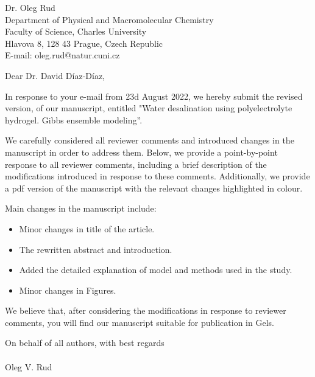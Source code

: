 \documentclass[12pt]{dinbrief}
\date{\today}
\newcommand{\theeditor}{Dr. David Díaz-Díaz}
\begin{document}
\begin{letter}{
Dr. Oleg Rud\\
Department of Physical and Macromolecular Chemistry\\
Faculty of Science, Charles University\\
Hlavova 8, 128 43 Prague, Czech Republic\\
E-mail: oleg.rud@natur.cuni.cz\\
}
\vspace*{-1.5cm}

\opening{Dear \theeditor,}


In response to your e-mail from 23d August 2022, we hereby submit the revised
version, of our manuscript, entitled "Water desalination using polyelectrolyte hydrogel. Gibbs ensemble modeling''.

We carefully considered all reviewer comments and introduced changes in the manuscript in order to address them.
Below, we provide a point-by-point response to all reviewer comments, including a brief description of the modifications introduced in response to these comments.
Additionally, we provide a pdf version of the manuscript with the relevant changes highlighted in colour.

Main changes in the manuscript include:
\begin{itemize}
    \item Minor changes in title of the article.
    \item The rewritten abstract and introduction.
    \item Added the detailed explanation of model and methods used in the study.
    \item Minor changes in Figures.

\end{itemize}

We believe that, after considering the modifications in response to reviewer comments, you will find our manuscript suitable for publication in Gels.

On behalf of all authors,
with best regards\\
\\
Oleg V. Rud\\


\end{letter}

\addtolength{\textwidth}{1.5cm}
\addtolength{\textheight}{2.0cm}
\end{document}
